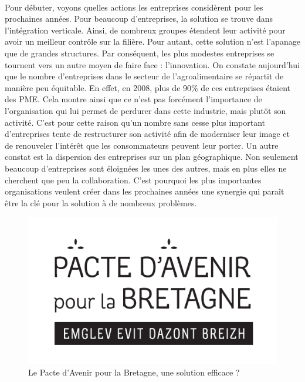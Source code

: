 \documentclass[a4paper,12pt]{report}
\begin{document}
			\paragraph{}Pour débuter, voyons quelles actions les entreprises considèrent pour les prochaines années. Pour beaucoup d’entreprises, la solution se trouve dans l’intégration verticale. Ainsi, de nombreux groupes étendent leur activité pour avoir un meilleur contrôle sur la filière. Pour autant, cette solution n’est l’apanage que de grandes structures. Par conséquent, les plus modestes entreprises se tournent vers un autre moyen de faire face : l’innovation. On constate aujourd’hui que le nombre d’entreprises dans le secteur de l’agroalimentaire se répartit de manière peu équitable. En effet, en 2008, plus de 90\% de ces entreprises étaient des PME\cite{IAAFranceChiffres}. Cela montre ainsi que ce n’est pas forcément l’importance de l’organisation qui lui permet de perdurer dans cette industrie, mais plutôt son activité. C’est pour cette raison qu’un nombre sans cesse plus important d’entreprises tente de restructurer son activité afin de moderniser leur image et de renouveler l’intérêt que les consommateurs peuvent leur porter. Un autre constat est la dispersion des entreprises sur un plan géographique. Non seulement beaucoup d’entreprises sont éloignées les unes des autres, mais en plus elles ne cherchent que peu la collaboration. C’est pourquoi les plus importantes organisations veulent créer dans les prochaines années une synergie qui paraît être la clé pour la solution à de nombreux problèmes.
			
			\begin{figure}[!h]
			\centering
			\includegraphics[scale=1]{Illustrations/Pacte_Avenir_Bretagne.png}
			\caption{Le Pacte d'Avenir pour la Bretagne, une solution efficace ?}
			\label{PacteAvenirPourBretagne}			
			\end{figure}
			
\end{document}
